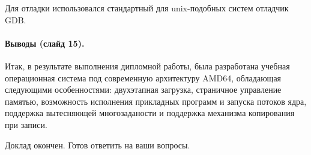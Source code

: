 \documentclass[12pt]{article}
\begin{document}
Для отладки использовался стандартный для unix-подобных систем отладчик GDB.

\paragraph{Выводы (слайд 15).}
Итак, в результате выполнения дипломной работы, была разработана учебная операционная
система под современную архитектуру AMD64, обладающая следующими особенностями:
двухэтапная загрузка, страничное управление памятью, возможность исполнения прикладных
программ и запуска потоков ядра, поддержка вытесняющей многозаданости и поддержка
механизма копирования при записи.

Доклад окончен. Готов ответить на ваши вопросы.
\end{document}
